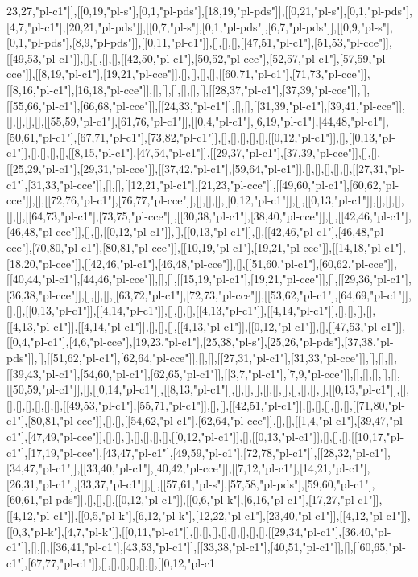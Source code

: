 23,27,"pl-c1"]],[[0,19,"pl-s"],[0,1,"pl-pds"],[18,19,"pl-pds"]],[[0,21,"pl-s"],[0,1,"pl-pds"],[4,7,"pl-c1"],[20,21,"pl-pds"]],[[0,7,"pl-s"],[0,1,"pl-pds"],[6,7,"pl-pds"]],[[0,9,"pl-s"],[0,1,"pl-pds"],[8,9,"pl-pds"]],[[0,11,"pl-c1"]],[],[],[],[[47,51,"pl-c1"],[51,53,"pl-cce"]],[[49,53,"pl-c1"]],[],[],[],[],[[42,50,"pl-c1"],[50,52,"pl-cce"],[52,57,"pl-c1"],[57,59,"pl-cce"]],[[8,19,"pl-c1"],[19,21,"pl-cce"]],[],[],[],[],[[60,71,"pl-c1"],[71,73,"pl-cce"]],[[8,16,"pl-c1"],[16,18,"pl-cce"]],[],[],[],[],[],[],[[28,37,"pl-c1"],[37,39,"pl-cce"]],[],[[55,66,"pl-c1"],[66,68,"pl-cce"]],[[24,33,"pl-c1"]],[],[],[[31,39,"pl-c1"],[39,41,"pl-cce"]],[],[],[],[],[[55,59,"pl-c1"],[61,76,"pl-c1"]],[[0,4,"pl-c1"],[6,19,"pl-c1"],[44,48,"pl-c1"],[50,61,"pl-c1"],[67,71,"pl-c1"],[73,82,"pl-c1"]],[],[],[],[],[],[[0,12,"pl-c1"]],[],[[0,13,"pl-c1"]],[],[],[],[],[[8,15,"pl-c1"],[47,54,"pl-c1"]],[[29,37,"pl-c1"],[37,39,"pl-cce"]],[],[],[[25,29,"pl-c1"],[29,31,"pl-cce"]],[[37,42,"pl-c1"],[59,64,"pl-c1"]],[],[],[],[],[],[[27,31,"pl-c1"],[31,33,"pl-cce"]],[],[],[[12,21,"pl-c1"],[21,23,"pl-cce"]],[[49,60,"pl-c1"],[60,62,"pl-cce"]],[],[[72,76,"pl-c1"],[76,77,"pl-cce"]],[],[],[],[[0,12,"pl-c1"]],[],[[0,13,"pl-c1"]],[],[],[],[],[],[[64,73,"pl-c1"],[73,75,"pl-cce"]],[[30,38,"pl-c1"],[38,40,"pl-cce"]],[],[[42,46,"pl-c1"],[46,48,"pl-cce"]],[],[],[[0,12,"pl-c1"]],[],[[0,13,"pl-c1"]],[],[[42,46,"pl-c1"],[46,48,"pl-cce"],[70,80,"pl-c1"],[80,81,"pl-cce"]],[[10,19,"pl-c1"],[19,21,"pl-cce"]],[[14,18,"pl-c1"],[18,20,"pl-cce"]],[[42,46,"pl-c1"],[46,48,"pl-cce"]],[],[[51,60,"pl-c1"],[60,62,"pl-cce"]],[[40,44,"pl-c1"],[44,46,"pl-cce"]],[],[],[[15,19,"pl-c1"],[19,21,"pl-cce"]],[],[[29,36,"pl-c1"],[36,38,"pl-cce"]],[],[],[],[[63,72,"pl-c1"],[72,73,"pl-cce"]],[[53,62,"pl-c1"],[64,69,"pl-c1"]],[],[],[[0,13,"pl-c1"]],[[4,14,"pl-c1"]],[],[],[],[[4,13,"pl-c1"]],[[4,14,"pl-c1"]],[],[],[],[],[[4,13,"pl-c1"]],[[4,14,"pl-c1"]],[],[],[],[[4,13,"pl-c1"]],[[0,12,"pl-c1"]],[],[[47,53,"pl-c1"]],[[0,4,"pl-c1"],[4,6,"pl-cce"],[19,23,"pl-c1"],[25,38,"pl-s"],[25,26,"pl-pds"],[37,38,"pl-pds"]],[],[[51,62,"pl-c1"],[62,64,"pl-cce"]],[],[],[[27,31,"pl-c1"],[31,33,"pl-cce"]],[],[],[],[[39,43,"pl-c1"],[54,60,"pl-c1"],[62,65,"pl-c1"]],[[3,7,"pl-c1"],[7,9,"pl-cce"]],[],[],[],[],[],[[50,59,"pl-c1"]],[],[[0,14,"pl-c1"]],[[8,13,"pl-c1"]],[],[],[],[],[],[],[],[],[],[],[[0,13,"pl-c1"]],[],[],[],[],[],[],[],[[49,53,"pl-c1"],[55,71,"pl-c1"]],[],[],[[42,51,"pl-c1"]],[],[],[],[],[],[[71,80,"pl-c1"],[80,81,"pl-cce"]],[],[],[[54,62,"pl-c1"],[62,64,"pl-cce"]],[],[],[[1,4,"pl-c1"],[39,47,"pl-c1"],[47,49,"pl-cce"]],[],[],[],[],[],[],[],[[0,12,"pl-c1"]],[],[[0,13,"pl-c1"]],[],[],[],[[10,17,"pl-c1"],[17,19,"pl-cce"],[43,47,"pl-c1"],[49,59,"pl-c1"],[72,78,"pl-c1"]],[[28,32,"pl-c1"],[34,47,"pl-c1"]],[[33,40,"pl-c1"],[40,42,"pl-cce"]],[[7,12,"pl-c1"],[14,21,"pl-c1"],[26,31,"pl-c1"],[33,37,"pl-c1"]],[],[[57,61,"pl-s"],[57,58,"pl-pds"],[59,60,"pl-c1"],[60,61,"pl-pds"]],[],[],[],[[0,12,"pl-c1"]],[[0,6,"pl-k"],[6,16,"pl-c1"],[17,27,"pl-c1"]],[[4,12,"pl-c1"]],[[0,5,"pl-k"],[6,12,"pl-k"],[12,22,"pl-c1"],[23,40,"pl-c1"]],[[4,12,"pl-c1"]],[[0,3,"pl-k"],[4,7,"pl-k"]],[[0,11,"pl-c1"]],[],[],[],[],[],[],[],[],[[29,34,"pl-c1"],[36,40,"pl-c1"]],[],[],[[36,41,"pl-c1"],[43,53,"pl-c1"]],[[33,38,"pl-c1"],[40,51,"pl-c1"]],[],[[60,65,"pl-c1"],[67,77,"pl-c1"]],[],[],[],[],[],[],[[0,12,"pl-c1